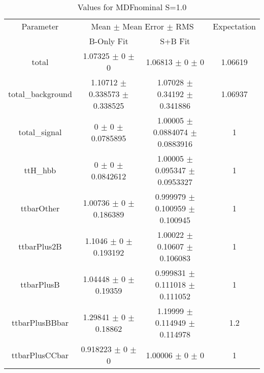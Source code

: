 \begin{table}
\centering
\caption{Values for MDFnominal S=1.0}
\begin{tabular}{cccc}
\toprule
Parameter & \multicolumn{2}{c}{Mean $\pm$ Mean Error $\pm$ RMS} & Expectation\\
 & B-Only Fit & S+B Fit & \\
\midrule
total & \num{1.07325} $\pm$ \num{0} $\pm$ \num{0} & \num{1.06813} $\pm$ \num{0} $\pm$ \num{0} & \num{1.06619}\\
total\_background & \num{1.10712} $\pm$ \num{0.338573} $\pm$ \num{0.338525} & \num{1.07028} $\pm$ \num{0.34192} $\pm$ \num{0.341886} & \num{1.06937}\\
total\_signal & \num{0} $\pm$ \num{0} $\pm$ \num{0.0785895} & \num{1.00005} $\pm$ \num{0.0884074} $\pm$ \num{0.0883916} & \num{1}\\
ttH\_hbb & \num{0} $\pm$ \num{0} $\pm$ \num{0.0842612} & \num{1.00005} $\pm$ \num{0.095347} $\pm$ \num{0.0953327} & \num{1}\\
ttbarOther & \num{1.00736} $\pm$ \num{0} $\pm$ \num{0.186389} & \num{0.999979} $\pm$ \num{0.100959} $\pm$ \num{0.100945} & \num{1}\\
ttbarPlus2B & \num{1.1046} $\pm$ \num{0} $\pm$ \num{0.193192} & \num{1.00022} $\pm$ \num{0.10607} $\pm$ \num{0.106083} & \num{1}\\
ttbarPlusB & \num{1.04448} $\pm$ \num{0} $\pm$ \num{0.19359} & \num{0.999831} $\pm$ \num{0.111018} $\pm$ \num{0.111052} & \num{1}\\
ttbarPlusBBbar & \num{1.29841} $\pm$ \num{0} $\pm$ \num{0.18862} & \num{1.19999} $\pm$ \num{0.114949} $\pm$ \num{0.114978} & \num{1.2}\\
ttbarPlusCCbar & \num{0.918223} $\pm$ \num{0} $\pm$ \num{0} & \num{1.00006} $\pm$ \num{0} $\pm$ \num{0} & \num{1}\\
\bottomrule
\end{tabular}
\end{table}